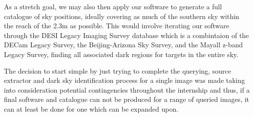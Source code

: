 \documentclass{article}
\begin{document}
As a stretch goal, we may also then apply our software to generate a full catalogue of sky positions, ideally covering as much of the southern sky within the reach of the 2.3m as possible. This would involve iterating our software through the DESI Legacy Imaging Survey database which is a combintaion of the DECam Legacy Survey, the Beijing-Arizona Sky Survey, and the Mayall z-band Legacy Survey, finding all associated dark regions for targets in the entire sky.

The decision to start simple by just trying to complete the querying, source extractor and dark sky identification process for a single image was made taking into consideration potential contingencies throughout the internship and thus, if a final software and catalogue can not be produced for a range of queried images, it can at least be done for one which can be expanded upon. 
\end{document}
